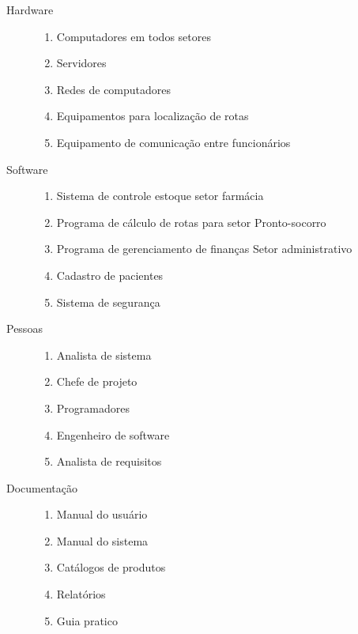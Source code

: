\begin{description}

  \item[Hardware]



    \begin{enumerate}
    
    \item Computadores em todos setores
    \item Servidores
    \item Redes de computadores
    \item Equipamentos para localização de rotas
    \item Equipamento de comunicação entre funcionários
  \end{enumerate}

  \item[Software]
     \begin{enumerate}[resume]
    \item Sistema de controle estoque setor farmácia
    \item Programa de cálculo de rotas para setor Pronto-socorro
    \item Programa de gerenciamento de finanças Setor administrativo
    \item Cadastro de pacientes
    \item Sistema de segurança
  \end{enumerate}

  \item[Pessoas]
   \begin{enumerate}[resume]
    \item Analista de sistema
    \item Chefe de projeto
    \item Programadores
    \item Engenheiro de software
    \item Analista de requisitos
  \end{enumerate}

  \item[Documentação]
  \begin{enumerate}[resume]
    \item Manual do usuário
    \item Manual do sistema
    \item Catálogos de produtos
    \item Relatórios
    \item Guia pratico
  \end{enumerate}


\end{description}
